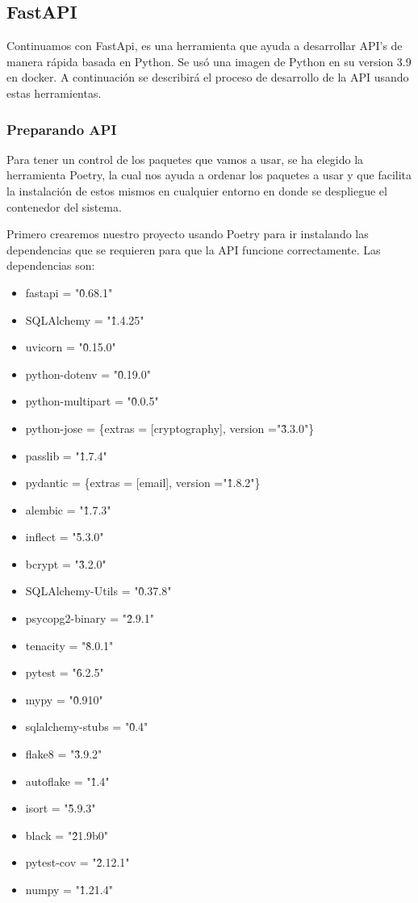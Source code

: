 \subsection{FastAPI}
Continuamos con FastApi, es una herramienta que ayuda a desarrollar API's de manera rápida basada en Python. Se usó una imagen de Python en su version 3.9 en docker. A continuación se describirá el proceso de desarrollo de la API usando estas herramientas.

\subsubsection{Preparando API}
Para tener un control de los paquetes que vamos a usar, se ha elegido la herramienta Poetry, la cual nos ayuda a ordenar los paquetes a usar y que facilita la instalación de estos mismos en cualquier entorno en donde se despliegue el contenedor del sistema.

Primero crearemos nuestro proyecto usando Poetry para ir instalando las dependencias que se requieren para que la API funcione correctamente. Las dependencias son: 
\begin{itemize}
    \item fastapi = "\^0.68.1"
    \item SQLAlchemy = "\^1.4.25"
    \item uvicorn = "\^0.15.0"
    \item python-dotenv = "\^0.19.0"
    \item python-multipart = "\^0.0.5"
    \item python-jose = \{extras = [cryptography], version ="\^3.3.0"\}
    \item passlib = "\^1.7.4"
    \item pydantic = \{extras = [email], version ="\^1.8.2"\}
    \item alembic = "\^1.7.3"
    \item inflect = "\^5.3.0"
    \item bcrypt = "\^3.2.0"
    \item SQLAlchemy-Utils = "\^0.37.8"
    \item psycopg2-binary = "\^2.9.1"
    \item tenacity = "\^8.0.1"
    \item pytest = "\^6.2.5"
    \item mypy = "\^0.910"
    \item sqlalchemy-stubs = "\^0.4"
    \item flake8 = "\^3.9.2"
    \item autoflake = "\^1.4"
    \item isort = "\^5.9.3"
    \item black = "\^21.9b0"
    \item pytest-cov = "\^2.12.1"
    \item numpy = "\^1.21.4"
\end{itemize}

